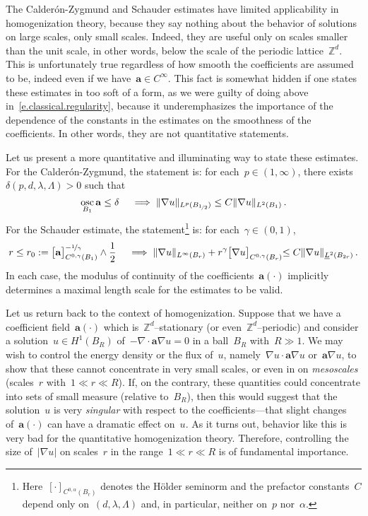 \documentclass[11pt,twoside]{article} %
\numberwithin{equation}{section}
\theoremstyle{definition}
\newcommand*{\Zd}{\ensuremath{\mathbb{Z}^d}}
\renewcommand{\a}{\mathbf{a}}
\DeclareMathOperator*{\osc}{osc}
\begin{document}
\smallskip

The Calder\'on-Zygmund and Schauder estimates have limited applicability in homogenization theory, because they say nothing about the behavior of solutions on large scales, only small scales. Indeed, they are useful only on scales smaller than the unit scale, in other words, below the scale of the periodic lattice~$\Zd$. This is unfortunately true regardless of how smooth the coefficients are assumed to be, indeed even if we have~$\a\in C^\infty$. This fact is somewhat hidden if one states these estimates in too soft of a form, as we were guilty of doing above in~\eqref{e.classical.regularity}, because it underemphasizes the importance of the dependence of the constants in the estimates on the smoothness of the coefficients. In other words, they are not quantitative statements. 

\smallskip

Let us present a more quantitative and illuminating way to state these estimates.
For the Calder\'on-Zygmund, the statement is: for each~$p\in(1,\infty)$, there exists~$\delta(p,d,\lambda,\Lambda)>0$ such that 
\begin{equation*}
\osc_{B_1} \a \leq \delta%
\quad 
\implies
\| \nabla u \|_{L^p(B_{\nicefrac12})}
\leq C \| \nabla u \|_{L^2(B_{1})}\,.
\end{equation*}
For the Schauder estimate, the statement\footnote{Here~$[\cdot]_{C^{0,\alpha}(B_r)}$ denotes the H\"older seminorm and the prefactor constants~$C$ depend only on~$(d,\lambda,\Lambda)$ and, in particular, neither on~$p$ nor~$\alpha$.} is: for each~$\gamma\in (0,1)$, 
\begin{equation}
\label{e.Schauder}
r \leq r_0:= \bigl[ \a \bigr]_{C^{0,\gamma}(B_{1})}^{-\nicefrac1\gamma} \wedge \frac12
\quad 
\implies
\| \nabla u \|_{L^\infty(B_{r})}
+ r^\gamma \bigl[ \nabla u \bigl]_{C^{0,\gamma}(B_{r})}
\leq C \| \nabla u \|_{\underline{L}^2(B_{2r})}\,.
\end{equation}
In each case, the modulus of continuity of the coefficients~$\a(\cdot)$ implicitly determines a maximal length scale for the estimates to be valid.

\smallskip

Let us return back to the context of homogenization. Suppose that we have a coefficient field~$\a(\cdot)$ which is~$\Zd$--stationary (or even~$\Zd$--periodic) and consider a solution~$u\in H^1(B_R)$ of~$-\nabla \cdot \a\nabla u=0$ in a ball~$B_R$ with~$R\gg 1$. We may wish to control the energy density or the flux of~$u$, namely~$\nabla u \cdot \a\nabla u$ or~$\a\nabla u$, to show that these cannot concentrate in very small scales, or even in on \emph{mesoscales} (scales~$r$ with~$1 \ll r \ll R$). If, on the contrary, these quantities could concentrate into sets of small measure (relative to~$B_R$), then this would suggest that the solution~$u$ is very \emph{singular} with respect to the coefficients---that slight changes of~$\a(\cdot)$ can have a dramatic effect on~$u$. As it turns out, behavior like this is very bad for the quantitative homogenization theory. Therefore, controlling the size of~$|\nabla u|$ on scales~$r$ in the range~$1\ll r \ll R$ is of fundamental importance. 
\end{document}
